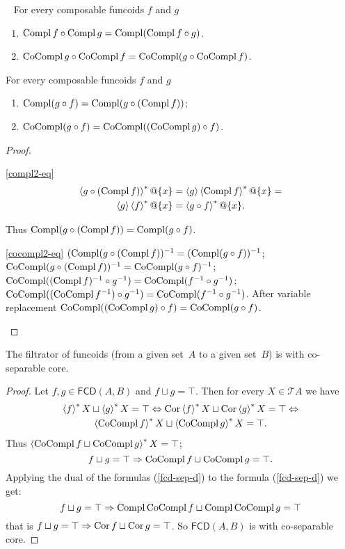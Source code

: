 \begin{cor}
~
For every composable funcoids $f$ and $g$
\begin{enumerate}
\item $\operatorname{Compl} f\circ\operatorname{Compl} g=\operatorname{Compl}(\operatorname{Compl} f\circ g)$.
\item $\operatorname{CoCompl} g\circ\operatorname{CoCompl} f=\operatorname{CoCompl}(g\circ\operatorname{CoCompl} f)$.
\end{enumerate}
\end{cor}
\begin{prop}
For every composable funcoids $f$ and $g$
\begin{enumerate}
\item \label{compl2-eq}$\operatorname{Compl}(g\circ f)=\operatorname{Compl}(g\circ(\operatorname{Compl} f))$;
\item \label{cocompl2-eq}$\operatorname{CoCompl}(g\circ f)=\operatorname{CoCompl}((\operatorname{CoCompl} g)\circ f)$.
\end{enumerate}
\end{prop}
\begin{proof}
~
\begin{widedisorder}
\item [{\ref{compl2-eq}}] ~
\begin{multline*}
\left\langle g\circ(\operatorname{Compl} f)\right\rangle ^{\ast}@\{x\}=\left\langle g\right\rangle\left\langle \operatorname{Compl}
f\right\rangle ^{\ast}@\{x\}=\\
\left\langle g\right\rangle\left\langle f\right\rangle ^{\ast}@\{x\}=\left\langle g\circ f\right\rangle ^{\ast}@\{x\}.
\end{multline*}



Thus $\operatorname{Compl}(g\circ(\operatorname{Compl} f))=\operatorname{Compl}(g\circ f)$.

\item [{\ref{cocompl2-eq}}] $(\operatorname{Compl}(g\circ(\operatorname{Compl} f))^{-1}=(\operatorname{Compl}(g\circ
f))^{-1}$;
$\operatorname{CoCompl}(g\circ(\operatorname{Compl} f))^{-1}=\operatorname{CoCompl}(g\circ f)^{-1}$; $\operatorname{CoCompl}((\operatorname{Compl}
f)^{-1}\circ g^{-1})=\operatorname{CoCompl}(f^{-1}\circ g^{-1})$;
$\operatorname{CoCompl}((\operatorname{CoCompl} f^{-1})\circ g^{-1})=\operatorname{CoCompl}(f^{-1}\circ g^{-1})$.
After variable replacement $\operatorname{CoCompl}((\operatorname{CoCompl} g)\circ f)=\operatorname{CoCompl}(g\circ f)$.
\end{widedisorder}
\end{proof}
\begin{thm}
The filtrator of funcoids (from a given set~$A$ to a given set~$B$)
is with co-separable core.\end{thm}
\begin{proof}
Let $f,g\in\mathsf{FCD}(A,B)$ and $f\sqcup g=\top$. Then for every
$X\in\mathscr{T}A$ we have
\begin{multline*}
\left\langle f\right\rangle^{\ast}X\sqcup\left\langle g\right\rangle^{\ast}X=\top\Leftrightarrow\operatorname{Cor}\left\langle f\right\rangle^{\ast}X\sqcup\operatorname{Cor}\left\langle g\right\rangle^{\ast}X=\top\Leftrightarrow\\
\left\langle \operatorname{CoCompl} f\right\rangle ^{\ast}X\sqcup\left\langle \operatorname{CoCompl} g\right\rangle ^{\ast}X=\top.
\end{multline*}
Thus $\left\langle \operatorname{CoCompl} f\sqcup\operatorname{CoCompl} g\right\rangle ^{\ast}X=\top$;
\begin{equation}
f\sqcup g=\top\Rightarrow\operatorname{CoCompl} f\sqcup\operatorname{CoCompl} g=\top.\label{fcd-sep-d}
\end{equation}
Applying the dual of the formulas (\ref{fcd-sep-d}) to the formula
(\ref{fcd-sep-d}) we get:
\[
f\sqcup g=\top\Rightarrow\operatorname{Compl}\operatorname{CoCompl} f\sqcup\operatorname{Compl}\operatorname{CoCompl} g=\top
\]
that is $f\sqcup g=\top\Rightarrow\operatorname{Cor} f\sqcup\operatorname{Cor} g=\top$. So
$\mathsf{FCD}(A,B)$
is with co-separable core.\end{proof}
